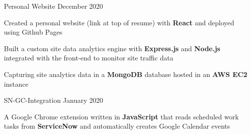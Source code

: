 \documentclass[]{awesome-cv}
\begin{document}

\begin{cventries}
    \cventry
	{}
	{Personal Website}
	{December 2020}
	{}
	{\begin{cvitems}
		\vspace{-4mm}
		\item {Created a personal website (link at top of resume) with \textbf{React}} and deployed using Github Pages 
		\item {Built a custom site data analytics engine with \textbf{Express.js} and \textbf{Node.js} integrated with the front-end to monitor site traffic data}
		\item {Capturing site analytics data in a \textbf{MongoDB} database hosted in an \textbf{AWS EC2} instance}
		\end{cvitems}}
	\cventry
	{}
	{SN-GC-Integration}
	{January 2020}
	{}
	{\begin{cvitems}
		\vspace{-4mm}
		\item {A Google Chrome extension written in \textbf{JavaScript} that reads scheduled work tasks from \textbf{ServiceNow} and automatically creates Google Calendar events}
		\end{cvitems}}
\end{cventries}
\end{document}
